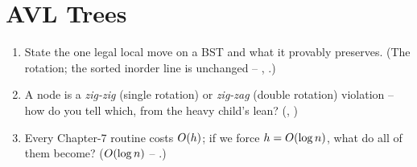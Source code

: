 \section{AVL Trees}\label{sec:c06-avl}

\begin{previouslybox}
\begin{enumerate}[nosep, leftmargin=1.6em]
  \item State the one legal local move on a BST and what it provably preserves. (The rotation; the
        sorted inorder line is unchanged -- , .)
  \item A node is a \emph{zig-zig} (single rotation) or \emph{zig-zag} (double rotation) violation --
        how do you tell which, from the heavy child's lean? (,
        )
  \item Every Chapter-7 routine costs $O(h)$; if we force $h=O(\log n)$, what do all of them
        become? ($O(\log n)$ -- .)
\end{enumerate}
\end{previouslybox}

